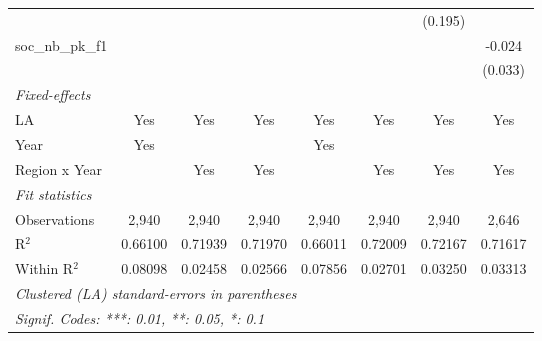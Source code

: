 \begin{table}[htbp]
\begin{tabular}{lccccccc}
                                                 &                &                &                &                &                & (0.195)       &   \\   
      soc\_nb\_pk\_f1                            &                &                &                &                &                &               & -0.024\\   
                                                 &                &                &                &                &                &               & (0.033)\\   
      \midrule
      \emph{Fixed-effects}\\
      LA                                         & Yes            & Yes            & Yes            & Yes            & Yes            & Yes           & Yes\\  
      Year                                       & Yes            &                &                & Yes            &                &               & \\  
      Region x Year                              &                & Yes            & Yes            &                & Yes            & Yes           & Yes\\  
      \midrule
      \emph{Fit statistics}\\
      Observations                               & 2,940          & 2,940          & 2,940          & 2,940          & 2,940          & 2,940         & 2,646\\  
      R$^2$                                      & 0.66100        & 0.71939        & 0.71970        & 0.66011        & 0.72009        & 0.72167       & 0.71617\\  
      Within R$^2$                               & 0.08098        & 0.02458        & 0.02566        & 0.07856        & 0.02701        & 0.03250       & 0.03313\\  
      \midrule \midrule
      \multicolumn{8}{l}{\emph{Clustered (LA) standard-errors in parentheses}}\\
      \multicolumn{8}{l}{\emph{Signif. Codes: ***: 0.01, **: 0.05, *: 0.1}}\\
   \end{tabular}
\end{table}


